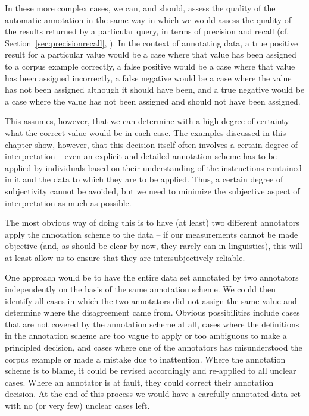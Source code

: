 In these more complex cases, we can, and should, assess the quality of the automatic annotation  in the same way in which we would assess the quality of the results returned by a particular query,  in terms of precision  and recall  (cf. Section~\ref{sec:precisionrecall}, ). In the context of annotating data, a true positive result for a particular value would be a case where that value has been assigned to a corpus example correctly, a false positive would be a case where that value has been assigned incorrectly, a false negative would be a case where the value has not been assigned although it should have been, and a true negative would be a case where the value has not been assigned and should not have been assigned.

This assumes, however, that we can determine with a high degree of certainty what the correct value would be in each case. The examples discussed in this chapter show, however, that this decision itself often involves a certain degree of interpretation -- even an explicit and detailed annotation  scheme has to be applied by individuals based on their understanding of the instructions contained in it and the data to which they are to be applied. Thus, a certain degree of subjectivity cannot be avoided, but we need to minimize the subjective aspect of interpretation as much as possible.

The most obvious way of doing this is to have (at least) two different annotators  apply the annotation scheme to the data -- if our measurements  cannot be made objective (and, as should be clear by now, they rarely can in linguistics), this will at least allow us to ensure that they are intersubjectively  reliable.

One approach would be to have the entire data set annotated  by two annotators independently on the basis of the same annotation scheme. We could then identify all cases in which the two annotators did not assign the same value and determine where the disagreement came from. Obvious possibilities include cases that are not covered by the annotation  scheme at all, cases where the definitions in the annotation scheme are too vague to apply or too ambiguous  to make a principled decision, and cases where one of the annotators has misunderstood the corpus example or made a mistake due to inattention. Where the annotation  scheme is to blame, it could be revised accordingly and re\hyp{}applied to all unclear cases. Where an annotator is at fault, they could correct their annotation decision. At the end of this process we would have a carefully annotated  data set with no (or very few) unclear cases left.

